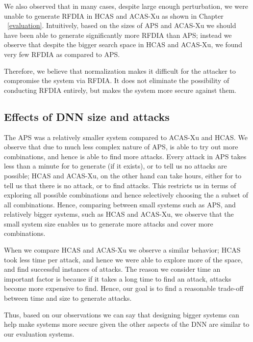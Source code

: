 We also observed that in many cases, despite large enough perturbation, we were unable to generate \ac{RFDIA} in \ac{HCAS} and \ac{ACAS-Xu} as shown in Chapter ~\ref{evaluation}.
Intuitively, based on the sizes of \ac{APS} and \ac{ACAS-Xu} we should have been able to generate significantly more \ac{RFDIA} than \ac{APS}; instead we observe that despite the bigger search space in \ac{HCAS} and \ac{ACAS-Xu}, we found very few \ac{RFDIA} as compared to \ac{APS}. 

Therefore, we believe that normalization makes it difficult for the attacker to compromise the system via \ac{RFDIA}. 
It does not eliminate the possibility of conducting \ac{RFDIA} entirely, but makes the system more secure against them. 

\subsection{Effects of DNN size and attacks}
The \ac{APS} was a relatively smaller system compared to \ac{ACAS-Xu} and \ac{HCAS}.
We observe that due to much less complex nature of \ac{APS}, \tool is able to try out more combinations, and hence is able to find more attacks. 
Every attack in \ac{APS} takes less than a minute for \tool to generate (if it exists), or to tell us no attacks are possible; 
\ac{HCAS} and \ac{ACAS-Xu}, on the other hand can take hours, either for \tool to tell us that there is no attack, or to find attacks.
This restricts us in terms of exploring all possible combinations and hence selectively choosing the a subset of all combinations. 
Hence, comparing between small systems such as \ac{APS}, and relatively bigger systems, such as \ac{HCAS} and \ac{ACAS-Xu}, we observe that the small system size enables us to generate more attacks and cover more combinations. 

When we compare \ac{HCAS} and \ac{ACAS-Xu} we observe a similar behavior; \ac{HCAS} took less time per attack, and hence we were able to explore more of the space, and find successful instances of attacks. 
The reason we consider time an important factor is because if it takes a long time to find an attack, attacks become more expensive to find. 
Hence, %
our goal is to find a reasonable trade-off between time and size to generate attacks. 

Thus, based on our observations we can say that designing bigger systems can help make systems more secure given the other aspects of the \ac{DNN} are similar to our evaluation systems. 



